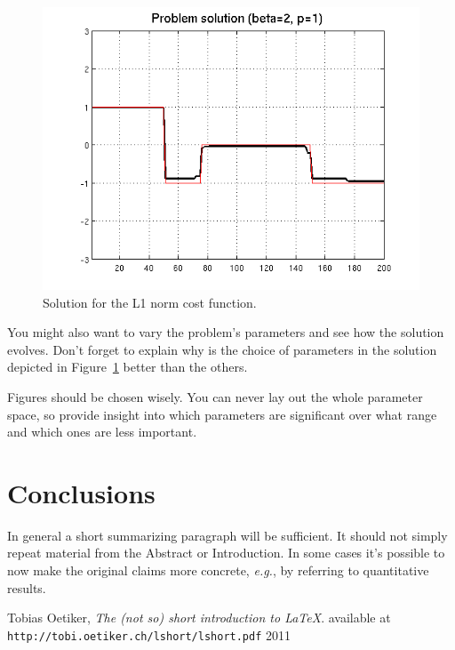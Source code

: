 \documentclass[a4paper]{IEEEtran}
\begin{document}
\begin{figure}[htp]
  \centering
  \includegraphics[width=0.9\columnwidth]{./solution1}
  \caption{Solution for the L1 norm cost function.}
  \label{fig:solution-l1}
\end{figure}

You might also want to vary the problem's parameters and see how the
solution evolves. Don't forget to explain why is the choice of
parameters in the solution depicted in Figure~\ref{fig:solution-l1}
better than the others.

Figures should be chosen wisely. You can never lay out the whole
parameter space, so provide insight into which parameters are
significant over what range and which ones are less important.



\section{Conclusions}
\label{sec:conclusion}

In general a short summarizing paragraph will be sufficient. It should
not simply repeat material from the Abstract or Introduction. In some
cases it's possible to now make the original claims more concrete,
\textit{e.g.}, by referring to quantitative results.


\begin{thebibliography}{9}

  Tobias Oetiker,
  \emph{The (not so) short introduction to \LaTeX}.
  available at \texttt{http://tobi.oetiker.ch/lshort/lshort.pdf}
  2011

\end{thebibliography}
\end{document}
